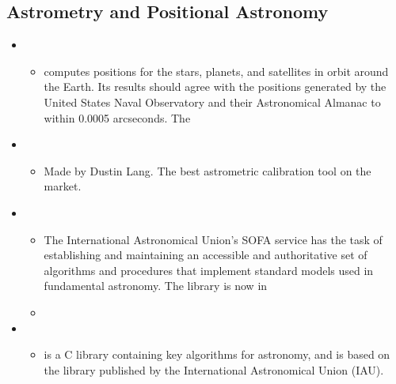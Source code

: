 \documentclass[letterpaper,10pt,english]{sphinxmanual}
\begin{document}
\subsection{Astrometry and Positional Astronomy}
\label{\detokenize{resource/astro/astro_research_basic:astrometry-and-positional-astronomy}}\begin{itemize}
\item {} 
\begin{itemize}
\item {} 
 computes positions for the stars, planets, and
satellites in orbit around the Earth. Its results should agree
with the positions generated by the United States Naval
Observatory and their Astronomical Almanac to within 0.0005
arcseconds. The 

\end{itemize}

\item {} 
\begin{itemize}
\item {} 
Made by Dustin Lang. The best astrometric calibration tool on the
market.

\end{itemize}

\item {} 
\begin{itemize}
\item {} 
The International Astronomical Union’s SOFA service has the task
of establishing and maintaining an accessible and authoritative
set of algorithms and procedures that implement standard models
used in fundamental astronomy. The library is now in 

\item {} 

\end{itemize}

\item {} 
\begin{itemize}
\item {} 
 is a C library containing key algorithms for astronomy,
and is based on the  library
published by the International Astronomical Union (IAU).


\end{itemize}
\end{itemize}
\end{document}
